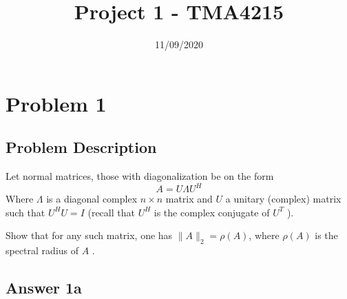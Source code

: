 \documentclass{article}
\title{Project 1 - TMA4215}
\date{11/09/2020}
\theoremstyle{remark}
\newcommand{\newpara}
  {
  \vskip 0.4cm
  }
\begin{document}
\maketitle
\tableofcontents
\newpage

\newpage
\section{Problem 1}%
\label{sec:problem_1}
\subsection{Problem Description}%
\label{sub:problem_describtion}

Let normal matrices, those with diagonalization be on the form \[
A = U \Lambda U^{H} 
\] 
Where $\Lambda $ is a diagonal complex $n\times n $ matrix and $U$ a unitary (complex) matrix such that $U ^{H} U = I$ (recall that $U^{H}$ is the complex conjugate of $U^{T}$ ).
\newpara
Show that for any such matrix, one has $\|A\|_{2} = \rho \left( A \right)$, where $\rho \left( A \right) $ is the spectral radius of $A$ .

\subsection{Answer 1a}%
\label{sub:proof}
\end{document}
